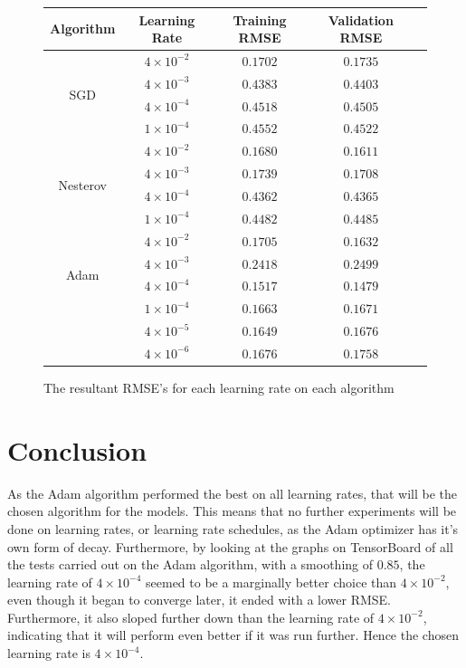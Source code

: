 \documentclass[12pt,a4paper,oneside,oldfontcommands]{memoir}
\begin{document}
\begin{Declaration Of OriginalityOrginality}
\begin{figure}[H]
    \centering
    \begin{tabular}{ |c|c|c|c|c| } 
    \hline
    Algorithm & Learning Rate & Training RMSE & Validation RMSE \\
    \hline
    \multirow{4}{4em}{SGD}
    & \(4\times10^{-2}\) & \(0.1702\) & \(0.1735\)\\ 
    & \(4\times10^{-3}\) & \(0.4383\) & \(0.4403\)\\ 
    & \(4\times10^{-4}\) & \(0.4518\) & \(0.4505\)\\ 
    & \(1\times10^{-4}\) & \(0.4552\) & \(0.4522\)\\
    \hline
    \multirow{4}{4em}{Nesterov}
    & \(4\times10^{-2}\) & \(0.1680\) & \(0.1611\)\\ 
    & \(4\times10^{-3}\) & \(0.1739\) & \(0.1708\)\\ 
    & \(4\times10^{-4}\) & \(0.4362\) & \(0.4365\)\\ 
    & \(1\times10^{-4}\) & \(0.4482\) & \(0.4485\)\\
    \hline
    \multirow{4}{4em}{Adam}
    & \(4\times10^{-2}\) & \(0.1705\) & \(0.1632\)\\ 
    & \(4\times10^{-3}\) & \(0.2418\) & \(0.2499\)\\ 
    & \(4\times10^{-4}\) & \(0.1517\) & \(0.1479\)\\ 
    & \(1\times10^{-4}\) & \(0.1663\) & \(0.1671\)\\
    & \(4\times10^{-5}\) & \(0.1649\) & \(0.1676\)\\ 
    & \(4\times10^{-6}\) & \(0.1676\) & \(0.1758\)\\
    \hline
    \end{tabular}
    \caption{The resultant RMSE's for each learning rate on each algorithm}
    \label{fig:learning_rates_table}
\end{figure}

\section{Conclusion} 
As the Adam algorithm performed the best on all learning rates, that will be the chosen algorithm for the models. This means that no further experiments will be done on learning rates, or learning rate schedules, as the Adam optimizer has it's own form of decay. Furthermore, by looking at the graphs on TensorBoard of all the tests carried out on the Adam algorithm, with a smoothing of \(0.85\), the learning rate of \(4\times10^{-4}\) seemed to be a marginally better choice than \(4\times10^{-2}\), even though it began to converge later, it ended with a lower RMSE. Furthermore, it also sloped further down than the learning rate of \(4\times10^{-2}\), indicating that it will perform even better if it was run further. Hence the chosen learning rate is \(4\times10^{-4}\). 


\end{Declaration Of OriginalityOrginality}
\end{document}
